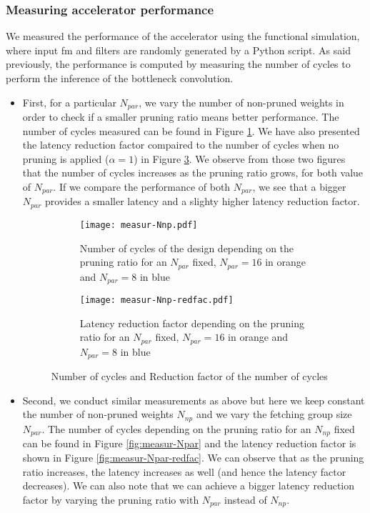\subsubsection{Measuring accelerator performance}
%
We measured the performance of the accelerator using the functional simulation, where input \acrshort{fm} and filters are randomly generated by a Python script. As said previously, the performance is computed by measuring the number of cycles to perform the inference of the bottleneck convolution.
%
\begin{itemize}
    \item First, for a particular $N_{par}$, we vary the number of non-pruned weights in order to check if a smaller pruning ratio means better performance. The number of cycles measured can be found in Figure \ref{fig:measur-Nnp}. We have also presented the latency reduction factor compaired to the number of cycles when no pruning is applied ($\alpha = 1$) in Figure \ref{fig:measur-Nnp-redfac}. We observe from those two figures that the number of cycles increases as the pruning ratio grows, for both value of $N_{par}$. If we compare the performance of both $N_{par}$, we see that a bigger $N_{par}$ provides a smaller latency and a slighty higher latency reduction factor.
    \begin{figure}[H]
        \centering
        \begin{subfigure}[t]{.49\textwidth}
            \centering
            \texttt{[image: measur-Nnp.pdf]}
            \caption{Number of cycles of the design depending on the pruning ratio for an $N_{par}$ fixed, $N_{par} = 16$ in orange and $N_{par} = 8$ in blue}
            \label{fig:measur-Nnp}
        \end{subfigure}
        \begin{subfigure}[t]{.49\textwidth}
            \centering
            \texttt{[image: measur-Nnp-redfac.pdf]}
            \caption{Latency reduction factor depending on the pruning ratio for an $N_{par}$ fixed, $N_{par} = 16$ in orange and $N_{par} = 8$ in blue}
            \label{fig:measur-Nnp-redfac}
        \end{subfigure}
        \caption{Number of cycles and Reduction factor of the number of cycles}
    \end{figure}
    \item Second, we conduct similar measurements as above but here we keep constant the number of non-pruned weights $N_{np}$ and we vary the fetching group size $N_{par}$. The number of cycles depending on the pruning ratio for an $N_{np}$ fixed can be found in Figure \ref{fig:measur-Npar} and the latency reduction factor is shown in Figure \ref{fig:measur-Npar-redfac}. We can observe that as the pruning ratio increases, the latency increases as well (and hence the latency factor decreases). We can also note that we can achieve a bigger latency reduction factor by varying the pruning ratio with $N_{par}$ instead of $N_{np}$.

\end{itemize}
